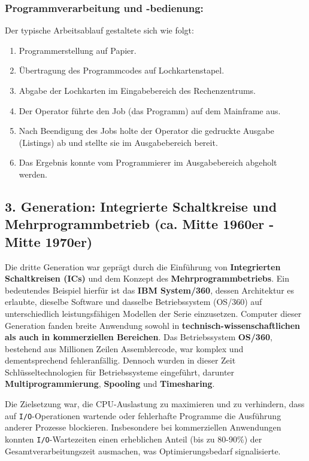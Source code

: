 \subsubsection*{Programmverarbeitung und -bedienung:}
Der typische Arbeitsablauf gestaltete sich wie folgt:
\begin{enumerate}
    \item Programmerstellung auf Papier.
    \item Übertragung des Programmcodes auf Lochkartenstapel.
    \item Abgabe der Lochkarten im Eingabebereich des Rechenzentrums.
    \item Der Operator führte den Job (das Programm) auf dem Mainframe aus.
    \item Nach Beendigung des Jobs holte der Operator die gedruckte Ausgabe (Listings) ab und stellte sie im Ausgabebereich bereit.
    \item Das Ergebnis konnte vom Programmierer im Ausgabebereich abgeholt werden.
\end{enumerate}

\subsection{3. Generation: Integrierte Schaltkreise und Mehrprogrammbetrieb (ca. Mitte 1960er - Mitte 1970er)}

Die dritte Generation war geprägt durch die Einführung von \textbf{Integrierten Schaltkreisen (ICs)} und dem Konzept des \textbf{Mehrprogrammbetriebs}. Ein bedeutendes Beispiel hierfür ist das \textbf{IBM System/360}, dessen Architektur es erlaubte, dieselbe Software und dasselbe Betriebssystem (OS/360) auf unterschiedlich leistungsfähigen Modellen der Serie einzusetzen. Computer dieser Generation fanden breite Anwendung sowohl in \textbf{technisch-wissenschaftlichen als auch in kommerziellen Bereichen}. Das Betriebssystem \textbf{OS/360}, bestehend aus Millionen Zeilen Assemblercode, war komplex und dementsprechend fehleranfällig. Dennoch wurden in dieser Zeit Schlüsseltechnologien für Betriebssysteme eingeführt, darunter \textbf{Multiprogrammierung}, \textbf{Spooling} und \textbf{Timesharing}.

Die Zielsetzung war, die CPU-Auslastung zu maximieren und zu verhindern, dass auf \texttt{I/O}-Operationen wartende oder fehlerhafte Programme die Ausführung anderer Prozesse blockieren. Insbesondere bei kommerziellen Anwendungen konnten \texttt{I/O}-Wartezeiten einen erheblichen Anteil (bis zu 80-90\%) der Gesamtverarbeitungszeit ausmachen, was Optimierungsbedarf signalisierte.

